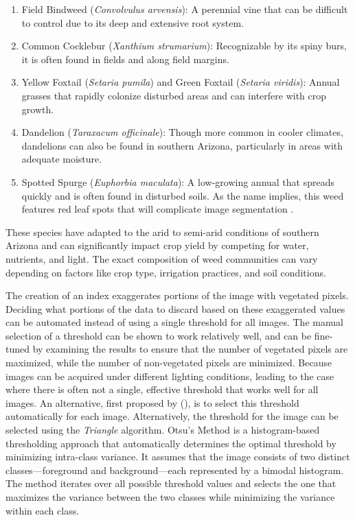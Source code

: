 \documentclass[letterpaper, notitlepage]{report}
\begin{document}
{\begin{enumerate}
	\item{Field Bindweed (\textit{Convolvulus arvensis}): A perennial vine that can be difficult to control due to its deep and extensive root system.}

	\item{Common Cocklebur (\textit{Xanthium strumarium}): Recognizable by its spiny burs, it is often found in fields and along field margins.}

	\item{Yellow Foxtail (\textit{Setaria pumila}) and Green Foxtail (\textit{Setaria viridis}): Annual grasses that rapidly colonize disturbed areas and can interfere with crop growth.}

	\item{Dandelion (\textit{Taraxacum officinale}): Though more common in cooler climates, dandelions can also be found in southern Arizona, particularly in areas with adequate moisture.}

	\item{Spotted Spurge (\textit{Euphorbia maculata}): A low-growing annual that spreads quickly and is often found in disturbed soils. As the name implies, this weed features red leaf spots that will complicate image segmentation \parencite{UC-Davis2009-qy}.}
\end{enumerate}

These species have adapted to the arid to semi-arid conditions of southern Arizona and can significantly impact crop yield by competing for water, nutrients, and light. The exact composition of weed communities can vary depending on factors like crop type, irrigation practices, and soil conditions.

The creation of an index exaggerates portions of the image with vegetated pixels. Deciding what portions of the data to discard based on these exaggerated values can be automated instead of using a single threshold for all images. The manual selection of a threshold can be shown to work relatively well, and can be fine-tuned by examining the results to ensure that the number of vegetated pixels are maximized, while the number of non-vegetated pixels are minimized. Because images can be acquired under different lighting conditions, leading to the case where there is often not a single, effective threshold that works well for all images. An alternative, first proposed by \citeauthor{Otsu1979-io} (\citeyear{Otsu1979-io}), is to select this threshold automatically for each image. Alternatively, the threshold for the image can be selected using the \textit{Triangle} algorithm.
Otsu’s Method is a histogram-based thresholding approach that automatically determines the optimal threshold by minimizing intra-class variance. It assumes that the image consists of two distinct classes—foreground and background—each represented by a bimodal histogram. The method iterates over all possible threshold values and selects the one that maximizes the variance between the two classes while minimizing the variance within each class.

}
\end{document}
